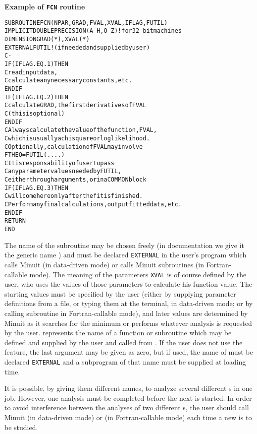 \begin{center}\small\textbf{Example of \texttt{FCN} routine}\end{center}
\begin{alltt}\footnotesize
        SUBROUTINE FCN(NPAR,GRAD,FVAL,XVAL,IFLAG,FUTIL)
        IMPLICIT DOUBLE PRECISION (A-H,O-Z)  !  for 32-bit machines
        DIMENSION GRAD(*),XVAL(*)
        EXTERNAL FUTIL   !    (if needed and supplied by user)
C-
        IF (IFLAG .EQ. 1)  THEN
C           read input data,
C           calculate any necessary constants, etc.
        ENDIF
        IF (IFLAG .EQ. 2)  THEN
C           calculate GRAD, the first derivatives of FVAL
C           (this is optional)
        ENDIF
C             Always calculate the value of the function, FVAL,
C             which is usually a chisquare or log likelihood.
C                  Optionally, calculation of FVAL may involve
        FTHEO = FUTIL(....)
C                  It is responsability of user to pass
C                  any parameter values needed by FUTIL,
C                  either through arguments, or in a COMMON block
         IF (IFLAG .EQ. 3)  THEN
C            will come here only after the fit is finished.
C            Perform any final calculations, output fitted data, etc.
        ENDIF
        RETURN
        END
\end{alltt}

The name of the subroutine may be chosen freely (in documentation we
give it the generic name ) and must be declared \texttt{EXTERNAL} in the
user's program which calls Minuit (in data-driven mode) or calls
Minuit subroutines (in Fortran-callable mode).
The meaning of the parameters \texttt{XVAL} is of course defined by
the user, who uses the values of those parameters to calculate his
function value.
The starting values must be specified by the user
(either by supplying parameter
definitions from a file, or typing them at the terminal,
in data-driven mode; or
by calling subroutine  in Fortran-callable mode),
and later values are determined by Minuit as it searches for the
minimum or performs whatever analysis is requested by the user.
 represents the name of a function or subroutine which may
be defined and supplied by the user and called from .
If the user does not use the  feature, the last argument
may be given as zero, but if used, the name of  must
be declared \texttt{EXTERNAL} and a subprogram of that name must be
supplied at loading time.
 
It is possible, by giving them different names, to analyze several
different s in one job.
However, one analysis must be completed before the next is started.
In order to avoid interference between the analyses of two different
s, the user should call Minuit (in data-driven mode) or 
(in Fortran-callable mode) each time a new  is to be studied.

